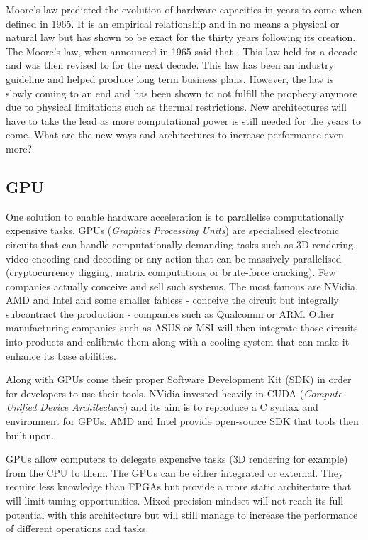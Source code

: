 Moore's law \cite{Moore2006} predicted the evolution of hardware capacities in years to come when defined in 1965. It is an empirical relationship and in no means a physical or natural law but has shown to be exact for the thirty years following its creation. The Moore's law, when announced in 1965 said that . This law held for a decade and was then revised to  for the next decade. This law has been an industry guideline and helped produce long term business plans. However, the law is slowly coming to an end and has been shown to not fulfill the prophecy anymore due to physical limitations such as thermal restrictions. New architectures will have to take the lead as more computational power is still needed for the years to come. What are the new ways and architectures to increase performance even more?


\subsection{GPU}

One solution to enable hardware acceleration is to parallelise computationally expensive tasks. GPUs (\emph{Graphics Processing Units}) are specialised electronic circuits that can handle computationally demanding tasks such as 3D rendering, video encoding and decoding or any action that can be massively parallelised (cryptocurrency digging, matrix computations or brute-force cracking). Few companies actually conceive and sell such systems. The most famous are NVidia, AMD and Intel and some smaller fabless - conceive the circuit but integrally subcontract the production -  companies such as Qualcomm or ARM. Other manufacturing companies such as ASUS or MSI will then integrate those circuits into products and calibrate them along with a cooling system that can make it enhance its base abilities.

Along with GPUs come their proper Software Development Kit (SDK) in order for developers to use their tools. NVidia invested heavily in CUDA (\emph{Compute Unified Device Architecture}) \cite{CUDA} and its aim is to reproduce a C syntax and environment for GPUs. AMD and Intel provide open-source SDK that tools then built upon.

GPUs allow computers to delegate expensive tasks (3D rendering for example) from the CPU to them. The GPUs can be either integrated or external. They require less knowledge than FPGAs but provide a more static architecture that will limit tuning opportunities. Mixed-precision mindset will not reach its full potential with this architecture but will still manage to increase the performance of different operations and tasks.

